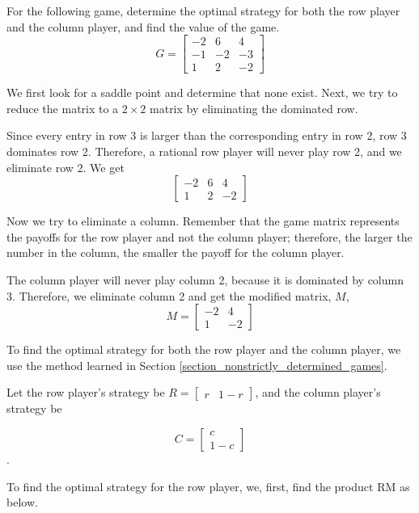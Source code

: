\begin{example}
    For the following game, determine the optimal strategy for both the row player and the column player, and find the value of the game.
    \[ G = \begin{bmatrix} -2 & 6 & 4 \\ -1 & -2 & -3 \\ 1 & 2 & -2 \end{bmatrix} \]
\end{example}
\begin{solution}
    We first look for a saddle point and determine that none exist. Next, we try to reduce the matrix to a \(2 \times 2\) matrix by eliminating the dominated row.

    Since every entry in row 3 is larger than the corresponding entry in row 2, row 3 dominates row 2. Therefore, a rational row player will never play row 2, and we eliminate row 2. We get
    \[ \begin{bmatrix} -2 & 6 & 4 \\ 1 & 2 & -2 \end{bmatrix} \]

    Now we try to eliminate a column. Remember that the game matrix represents the payoffs for the row player and not the column player; therefore, the larger the number in the column, the smaller the payoff for the column player.

    The column player will never play column 2, because it is dominated by column 3. Therefore, we eliminate column 2 and get the modified matrix, \(M\),
    \[ M = \begin{bmatrix} -2 & 4 \\ 1 & -2 \end{bmatrix} \]

    To find the optimal strategy for both the row player and the column player, we use the method learned in Section \ref{section_nonstrictly_determined_games}.

    Let the row player's strategy be \( R = \begin{bmatrix} r & 1-r \end{bmatrix} \), and the column player's strategy be

    \[ C = \begin{bmatrix} c \\ 1-c \end{bmatrix} \].

    To find the optimal strategy for the row player, we, first, find the product RM as below.


\end{solution}

